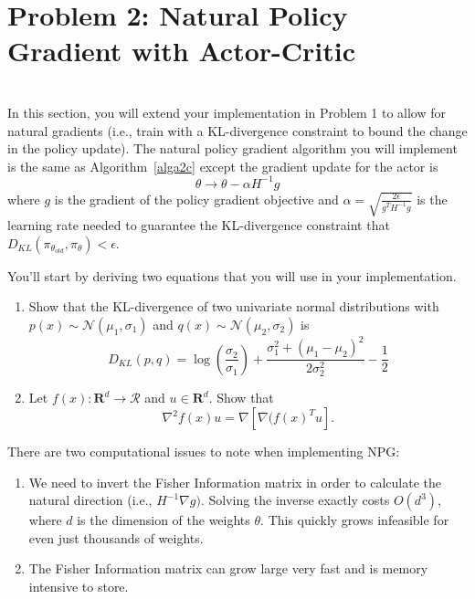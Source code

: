 \documentclass[12pt]{article}
\begin{document}
\section*{Problem 2: Natural Policy Gradient with Actor-Critic}
\ \\
In this section, you will extend your implementation in Problem 1 to allow for natural gradients (i.e., train with a KL-divergence constraint to bound the change in the policy update).  The natural policy gradient algorithm you will implement is the same as Algorithm~\ref{alga2c} except the gradient update for the actor is
\[\theta \rightarrow \theta - \alpha H^{-1}
g\] 
where $g$ is the gradient of the policy gradient objective and $\alpha = \sqrt{\frac{2\epsilon}{g^TH^{-1}g}}$ is the learning rate needed to guarantee the KL-divergence constraint that $D_{KL}(\pi_{\theta_{old}},\pi_\theta)<\epsilon$.  

You'll start by deriving two equations that you will use in 
your implementation.
\begin{enumerate}
    \item Show that the KL-divergence of two univariate normal distributions with $p(x)\sim \mathcal{N}(\mu_1, \sigma_1)$ and $q(x)\sim \mathcal{N}(\mu_2,\sigma_2)$ is 
    \[
    D_{KL}(p, q) = \log(\frac{\sigma_2}{\sigma_1}) + \frac{\sigma_1^2 + (\mu_1-\mu_2)^2}{2\sigma_2^2} - \frac{1}{2}\]
    \begin{solution}
    
    \end{solution}
    \item Let $f(x): \mathbf{R}^d \rightarrow \mathcal{R}$ and $u\in \mathbf{R}^d$.  Show that
    \[\nabla^2f(x)u = \nabla[\nabla(f(x)^T u].\]
    \begin{solution}
    
    \end{solution}
\end{enumerate}

There are two computational issues to note when implementing NPG:
\begin{enumerate}
    \item We need to invert the Fisher Information matrix in order to calculate the natural direction (i.e., $H^{-1}\nabla g)$.  Solving the inverse exactly costs $O(d^3)$, where $d$ is the dimension of the weights $\theta$.  This quickly grows infeasible for even just thousands of weights.  
    \item The Fisher Information matrix can grow large very fast and is memory intensive to store.
\end{enumerate}
\end{document}
